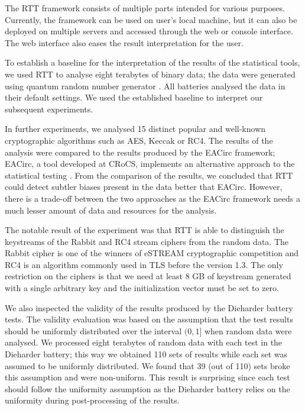 \documentclass[
	digital,    %
	oneside,    %
	color,
	11pt,
	nocover,
	notable,
	nolof,
	nolot,
]{fithesis3}
\theoremstyle{definition}
\theoremstyle{remark}
\begin{document}
The RTT framework consists of multiple parts intended for various purposes. Currently, the framework can be used on user's local machine, but it can also be deployed on multiple servers and accessed through the web or console interface. The web interface also eases the result interpretation for the user.

To establish a baseline for the interpretation of the results of the statistical tools, we used RTT to analyse eight terabytes of binary data; the data were generated using quantum random number generator \cite{qrng-service-germany}. All batteries analysed the data in their default settings. We used the established baseline to interpret our subsequent experiments. 

In further experiments, we analysed 15 distinct popular and well-known cryptographic algorithms such as AES, Keccak or RC4. The results of the analysis were compared to the results produced by the EACirc framework; EACirc, a tool developed at CRoCS, implements an alternative approach to the statistical testing \cite{eacirc-github}. From the comparison of the results, we concluded that RTT could detect subtler biases present in the data better that EACirc. However, there is a trade-off between the two approaches as the EACirc framework needs a much lesser amount of data and resources for the analysis. 

The notable result of the experiment was that RTT is able to distinguish the keystreams of the Rabbit \cite{rabbit} and RC4 \cite{rc4} stream ciphers from the random data. The Rabbit cipher is one of the winners of eSTREAM \cite{estream-competition} cryptographic competition and RC4 is an algorithm commonly used in TLS before the version 1.3. The only restriction on the ciphers is that we need at least 8 GB of keystream generated with a single arbitrary key and the initialization vector must be set to zero.

We also inspected the validity of the results produced by the Dieharder battery tests. The validity evaluation was based on the assumption that the test results should be uniformly distributed over the interval $(0,1]$ when random data were analysed. We processed eight terabytes of random data with each test in the Dieharder battery; this way we obtained 110 sets of results while each set was assumed to be uniformly distributed. We found that 39 (out of 110) sets broke this assumption and were non-uniform. This result is surprising since each test should follow the uniformity assumption as the Dieharder battery relies on the uniformity during post-processing of the results.
\end{document}
